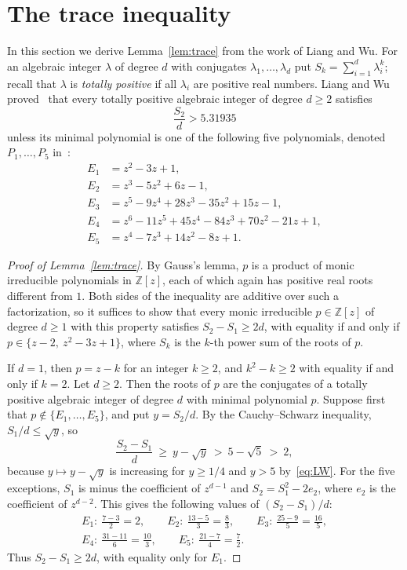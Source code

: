 \documentclass{amsart}
\theoremstyle{definition}
\theoremstyle{remark}
\numberwithin{equation}{section}
\newcommand{\Z}{\mathbb{Z}}
\begin{document}
\section{The trace inequality}\label{sec:trace}

In this section we derive Lemma~\ref{lem:trace} from the work of Liang and Wu. For an algebraic integer $\lambda$ of degree $d$ with conjugates $\lambda_1,\dots,\lambda_d$ put $S_k=\sum_{i=1}^d\lambda_i^k$; recall that $\lambda$ is \emph{totally positive} if all $\lambda_i$ are positive real numbers. Liang and Wu proved~\cite[Theorem~1.4]{LW11} that every totally positive algebraic integer of degree $d\ge2$ satisfies
\begin{equation}\label{eq:LW}
\frac{S_2}{d}>5.31935
\end{equation}
unless its minimal polynomial is one of the following five polynomials, denoted $P_1,\dots,P_5$ in~\cite{LW11}:
\begin{align*}
E_1&=z^2-3z+1,\\
E_2&=z^3-5z^2+6z-1,\\
E_3&=z^5-9z^4+28z^3-35z^2+15z-1,\\
E_4&=z^6-11z^5+45z^4-84z^3+70z^2-21z+1,\\
E_5&=z^4-7z^3+14z^2-8z+1.
\end{align*}

\begin{proof}[Proof of Lemma~\ref{lem:trace}]
By Gauss's lemma, $p$ is a product of monic irreducible polynomials in $\Z[z]$, each of which again has positive real roots different from $1$. Both sides of the inequality are additive over such a factorization, so it suffices to show that every monic irreducible $p\in\Z[z]$ of degree $d\ge1$ with this property satisfies $S_2-S_1\ge 2d$, with equality if and only if $p\in\{z-2,\ z^2-3z+1\}$, where $S_k$ is the $k$-th power sum of the roots of $p$.

If $d=1$, then $p=z-k$ for an integer $k\ge2$, and $k^2-k\ge2$ with equality if and only if $k=2$. Let $d\ge2$. Then the roots of $p$ are the conjugates of a totally positive algebraic integer of degree $d$ with minimal polynomial $p$. Suppose first that $p\notin\{E_1,\dots,E_5\}$, and put $y=S_2/d$. By the Cauchy--Schwarz inequality, $S_1/d\le\sqrt{y}$, so
\[
\frac{S_2-S_1}{d}\ \ge\ y-\sqrt y\ >\ 5-\sqrt5\ >\ 2,
\]
because $y\mapsto y-\sqrt y$ is increasing for $y\ge 1/4$ and $y>5$ by~\eqref{eq:LW}. For the five exceptions, $S_1$ is minus the coefficient of $z^{d-1}$ and $S_2=S_1^2-2e_2$, where $e_2$ is the coefficient of $z^{d-2}$. This gives the following values of $(S_2-S_1)/d$:
\begin{gather*}
E_1\colon\ \tfrac{7-3}{2}=2,\qquad E_2\colon\ \tfrac{13-5}{3}=\tfrac83,\qquad E_3\colon\ \tfrac{25-9}{5}=\tfrac{16}5,\\
E_4\colon\ \tfrac{31-11}{6}=\tfrac{10}3,\qquad E_5\colon\ \tfrac{21-7}{4}=\tfrac72.
\end{gather*}
Thus $S_2-S_1\ge2d$, with equality only for $E_1$.
\end{proof}
\end{document}
